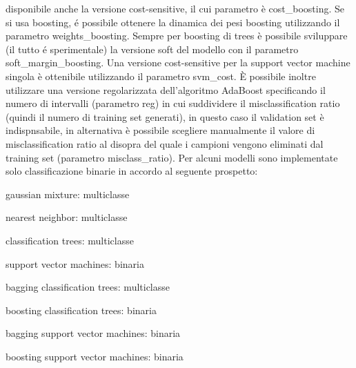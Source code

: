 disponibile anche la versione cost-sensitive, il cui parametro \`{e}
cost\_boosting. Se si usa boosting, \'e possibile ottenere la dinamica
dei pesi boosting utilizzando il parametro weights\_boosting. Sempre
per boosting di trees \`e possibile sviluppare (il tutto \'e
sperimentale) la versione soft del modello con il parametro
soft\_margin\_boosting. Una versione cost-sensitive per la support
vector machine singola \`e ottenibile utilizzando il parametro
svm\_cost. 
\`E possibile inoltre utilizzare una versione regolarizzata dell'algoritmo
AdaBoost specificando il numero di intervalli (parametro reg) in cui
suddividere il misclassification ratio (quindi il numero di 
training set generati), in questo caso il validation set \`e indispnsabile, in 
alternativa \`e possibile scegliere manualmente il valore di misclassification 
ratio al disopra del quale i campioni vengono eliminati dal training set 
(parametro misclass\_ratio).
Per alcuni modelli sono implementate solo classificazione
binarie in accordo al seguente prospetto:

\noindent
gaussian mixture: multiclasse

\noindent
nearest neighbor: multiclasse

\noindent
classification trees: multiclasse

\noindent
support vector machines: binaria

\noindent
bagging classification trees: multiclasse

\noindent
boosting classification trees: binaria

\noindent
bagging support vector machines: binaria

\noindent
boosting support vector machines: binaria

